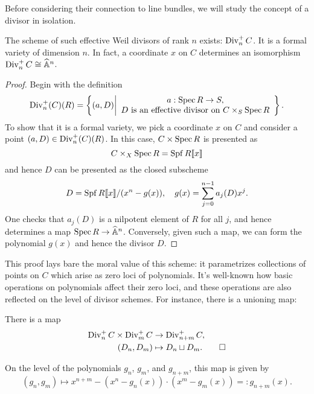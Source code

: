 Before considering their connection to line bundles, we will study the concept of a divisor in isolation.

\begin{lemma}
The scheme of such effective Weil divisors of rank $n$ exists: $\operatorname{Div}_n^+ C$.  It is a formal variety of dimension $n$.  In fact, a coordinate $x$ on $C$ determines an isomorphism $\operatorname{Div}_n^+ C \cong \widehat{\mathbb{A}}^n$.
\end{lemma}
\begin{proof}
Begin with the definition \[\operatorname{Div}_n^+(C)(R) = \left\{(a, D) \middle| \begin{array}{c} a: \operatorname{Spec} R \to S, \\ \text{$D$ is an effective divisor on $C \times_S \operatorname{Spec} R$} \end{array} \right\}.\]  To show that it is a formal variety, we pick a coordinate $x$ on $C$ and consider a point $(a, D) \in \operatorname{Div}_n^+(C)(R)$.  In this case, $C \times \operatorname{Spec} R$ is presented as \[C \times_X \operatorname{Spec} R = \operatorname{Spf} R\llbracket x \rrbracket\] and hence $D$ can be presented as the closed subscheme \[D = \operatorname{Spf} R\llbracket x \rrbracket / (x^n - g(x)), \quad g(x) = \sum_{j=0}^{n-1} a_j(D) x^j.\]  One checks that $a_j(D)$ is a nilpotent element of $R$ for all $j$, and hence determines a map $\operatorname{Spec} R \to \widehat{\mathbb{A}}^n$.  Conversely, given such a map, we can form the polynomial $g(x)$ and hence the divisor $D$.
\end{proof}

This proof lays bare the moral value of this scheme: it parametrizes collections of points on $C$ which arise as zero loci of polynomials.  It's well-known how basic operations on polynomials affect their zero loci, and these operations are also reflected on the level of divisor schemes.  For instance, there is a unioning map:
\begin{lemma}
There is a map
\begin{align*}
\operatorname{Div}_n^+ C \times \operatorname{Div}_m^+ C & \to \operatorname{Div}_{n+m}^+ C, \\
(D_n, D_m) & \mapsto D_n \sqcup D_m. \qed
\end{align*}
\end{lemma}
\begin{remark}\label{DescriptionOfSqCupMapOnPolynomials}
On the level of the polynomials $g_n$, $g_m$, and $g_{n+m}$, this map is given by \[(g_n, g_m) \mapsto x^{n+m} - (x^n - g_n(x)) \cdot (x^m - g_m(x)) =: g_{n+m}(x).\]
\end{remark}

